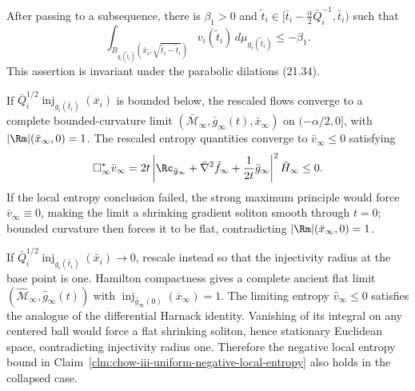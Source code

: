 \begin{theorem}
\label{clm:chow-iii-uniform-negative-local-entropy}
After passing to a subsequence, there is \(\beta_1>0\) and
\(\widetilde t_i\in[\bar t_i-\frac\alpha2\bar Q_i^{-1},\bar t_i)\) such that
\[
\int_{B_{g_i(\widetilde t_i)}(\bar x_i,\sqrt{\bar t_i-\widetilde t_i})}
v_i(\widetilde t_i)\,d\mu_{g_i(\widetilde t_i)}\le-\beta_1.
\]
This assertion is invariant under the parabolic dilations (21.34).
\end{theorem}

\begin{lemma}
\label{lem:chow-iii-noncollapsed-entropy-limit}
If \(\bar Q_i^{1/2}\operatorname{inj}_{g_i(\bar t_i)}(\bar x_i)\) is bounded below, the
rescaled flows converge to a complete bounded-curvature limit
\((\bar{\mathcal M}_\infty,\bar g_\infty(t),\bar x_\infty)\) on
\((-\alpha/2,0]\), with \(|\Rm|(\bar x_\infty,0)=1\).  The rescaled entropy
quantities converge to \(\bar v_\infty\le0\) satisfying
\[
\Box_\infty^*\bar v_\infty
 =2t\left|\Rc_{\bar g_\infty}+\bar\nabla^2\bar f_\infty+\frac1{2t}\bar g_\infty\right|^2\bar H_\infty\le0.
\]
If the local entropy conclusion failed, the strong maximum principle would
force \(\bar v_\infty\equiv0\), making the limit a shrinking gradient soliton
smooth through \(t=0\); bounded curvature then forces it to be flat, contradicting
\(|\Rm|(\bar x_\infty,0)=1\).
\end{lemma}

\begin{lemma}
\label{lem:chow-iii-collapsed-entropy-limit}
If \(\bar Q_i^{1/2}\operatorname{inj}_{g_i(\bar t_i)}(\bar x_i)\to0\), rescale instead so that
the injectivity radius at the base point is one.  Hamilton compactness gives a
complete ancient flat limit \((\widehat{\mathcal M}_\infty,\widehat g_\infty(t))\)
with \(\operatorname{inj}_{\widehat g_\infty(0)}(\bar x_\infty)=1\).  The limiting entropy
\(\widehat v_\infty\le0\) satisfies the analogue of the differential Harnack
identity.  Vanishing of its integral on any centered ball would force a flat
shrinking soliton, hence stationary Euclidean space, contradicting injectivity
radius one.  Therefore the negative local entropy bound in Claim~\ref{clm:chow-iii-uniform-negative-local-entropy} also holds in the collapsed case.
\end{lemma}


